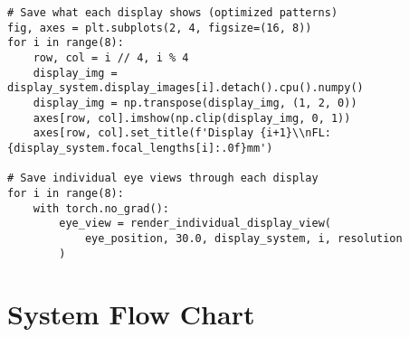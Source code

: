 \documentclass[12pt,a4paper]{article}
\begin{document}
\begin{lstlisting}[caption=Debug Output Generation]
# Save what each display shows (optimized patterns)
fig, axes = plt.subplots(2, 4, figsize=(16, 8))
for i in range(8):
    row, col = i // 4, i % 4
    display_img = display_system.display_images[i].detach().cpu().numpy()
    display_img = np.transpose(display_img, (1, 2, 0))
    axes[row, col].imshow(np.clip(display_img, 0, 1))
    axes[row, col].set_title(f'Display {i+1}\\nFL: {display_system.focal_lengths[i]:.0f}mm')

# Save individual eye views through each display
for i in range(8):
    with torch.no_grad():
        eye_view = render_individual_display_view(
            eye_position, 30.0, display_system, i, resolution
        )
\end{lstlisting}


\section{System Flow Chart}
\end{document}

